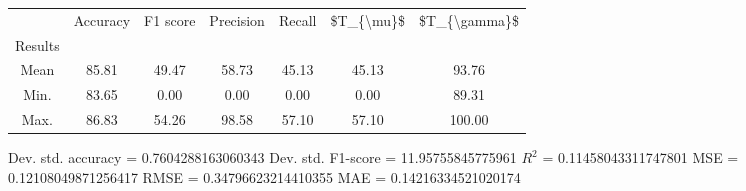\begin{tabular}{|c|c|c|c|c|c|c|}
\toprule
{} &  Accuracy &  F1 score &  Precision &  Recall &  \$T\_\{\textbackslash mu\}\$ &  \$T\_\{\textbackslash gamma\}\$ \\
Results &           &           &            &         &            &               \\
\hline
Mean    &     85.81 &     49.47 &      58.73 &   45.13 &      45.13 &         93.76 \\
Min.    &     83.65 &      0.00 &       0.00 &    0.00 &       0.00 &         89.31 \\
Max.    &     86.83 &     54.26 &      98.58 &   57.10 &      57.10 &        100.00 \\
\bottomrule
\end{tabular}

 Dev. std. accuracy = 0.7604288163060343
 Dev. std. F1-score = 11.95755845775961
 $R^2$ = 0.11458043311747801
 MSE = 0.12108049871256417
 RMSE = 0.34796623214410355
 MAE = 0.14216334521020174